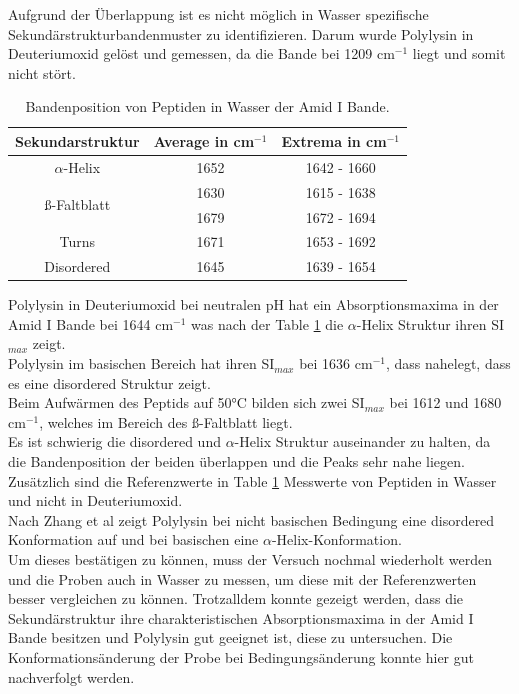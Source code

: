\documentclass[10pt,a4paper]{article}
\begin{document}
				Aufgrund der Überlappung ist es nicht möglich in Wasser spezifische Sekundärstrukturbandenmuster zu identifizieren. Darum wurde Polylysin in Deuteriumoxid gelöst und gemessen, da die Bande bei 1209 cm$^{-1}$  \cite{infrared_d2o_h2o} liegt und somit nicht stört.
				
				
					\begin{table}[H]
						\centering
						\caption{Bandenposition von Peptiden in Wasser der Amid I Bande\cite{Script}.}
						\label{tab:ref_values_sec_stru}
						\begin{tabular}{ccc}
							\toprule
							Sekundarstruktur & Average in  cm$^{-1}$& Extrema in cm$^{-1}$\\
							\midrule
							$\alpha$-Helix & 1652 & 1642 - 1660\\
							\midrule
							\multirow{2}{*}{ß-Faltblatt } & 1630 & 1615 - 1638\\
							& 1679 & 1672 - 1694\\
							\midrule
							Turns & 1671 & 1653 - 1692 \\
							\midrule
							Disordered & 1645 & 1639 - 1654\\
							\bottomrule
						\end{tabular}
					\end{table}				
						
			Polylysin in Deuteriumoxid bei neutralen pH hat ein Absorptionsmaxima in der Amid I Bande bei 1644 cm$^{-1}$ was nach der Table \ref{tab:ref_values_sec_stru} die $\alpha$-Helix Struktur ihren SI$_{max}$ zeigt.\\
			Polylysin im basischen Bereich hat ihren SI$_{max}$  bei 1636 cm$^{-1}$, dass nahelegt, dass es eine disordered Struktur zeigt.\\
			Beim Aufwärmen des Peptids auf 50°C bilden sich zwei SI$_{max}$  bei 1612 und 1680 cm$^{-1}$, welches im Bereich des ß-Faltblatt liegt.\\
			Es ist schwierig die disordered und $\alpha$-Helix Struktur auseinander zu halten, da die Bandenposition der beiden überlappen und die Peaks sehr nahe liegen. Zusätzlich sind die Referenzwerte in Table \ref{tab:ref_values_sec_stru} Messwerte von Peptiden in Wasser und nicht in  Deuteriumoxid.\\
			Nach Zhang et al\cite{Polylysin} zeigt Polylysin bei nicht basischen Bedingung eine disordered Konformation auf und bei basischen eine $\alpha$-Helix-Konformation.\\
			Um dieses bestätigen zu können, muss der Versuch nochmal wiederholt werden und die Proben auch in Wasser zu messen, um diese mit der Referenzwerten besser vergleichen zu können.
			Trotzalldem konnte gezeigt werden, dass die Sekundärstruktur ihre charakteristischen Absorptionsmaxima in der Amid I Bande besitzen und Polylysin gut geeignet ist, diese zu untersuchen.
			Die Konformationsänderung der Probe bei Bedingungsänderung konnte hier gut nachverfolgt werden.
\end{document}
